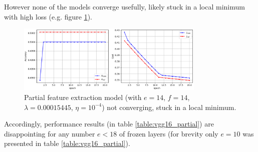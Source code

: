 However none of the models converge usefully, likely stuck in a local minimum with high loss (e.g. figure \ref{fig:vgg16_partial_divergence}).

\begin{figure}[ht]
    \centering
    \includegraphics[width=0.8\textwidth]{figs/vgg16_partial_divergence.png}
    \caption{Partial feature extraction model (with $e = 14$, $f = 14$, $\lambda = 0.00015445$, $\eta = 10^{-4}$) not converging, stuck in a local minimum.}
    \label{fig:vgg16_partial_divergence}
\end{figure}

Accordingly, performance results (in table \ref{table:vgg16_partial}) are disappointing for any number $e < 18$ of frozen layers (for brevity only $e = 10$ was presented in table \ref{table:vgg16_partial}).


